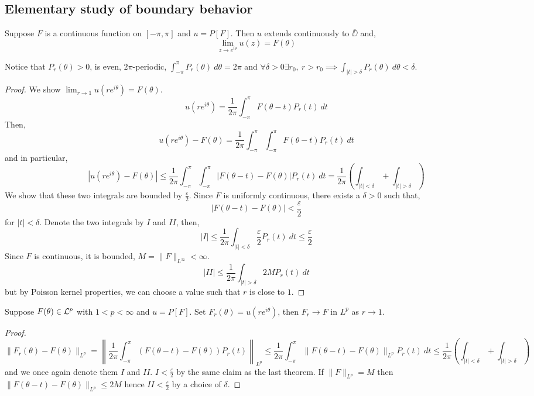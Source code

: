 \subsection{Elementary study of boundary behavior}
\begin{theorem}
	Suppose $F$ is a continuous function on $[-\pi, \pi]$ and $u = P[F]$.
	Then $u$ extends continuously to $\overline{\DD}$ and,
	\[
		\lim_{z \to e^{i \theta}} u(z)
		= F(\theta)
	\]
\end{theorem}
Notice that $P_r(\theta) > 0$, is even, $2 \pi$-periodic, $\int_{-\pi}^{\pi} P_r(\theta)\ d \theta = 2 \pi$
and $\forall \delta > 0 \exists r_0,\ r > r_0 \implies \int_{|t| > \delta} P_r(\theta)\ d \theta < \delta$.
\begin{proof}
	We show $\lim_{r \to 1} u(r e^{i \theta}) = F(\theta)$.
	\[
		u(r e^{i \theta})
		= \frac{1}{2 \pi} \int_{-\pi}^{\pi} F(\theta - t) P_r(t)\ d t
	\]
	Then,
	\[
		u(r e^{i \theta}) - F(\theta)
		= \frac{1}{2 \pi} \int_{-\pi}^{\pi} \int_{-\pi}^{\pi} F(\theta - t) P_r(t)\ dt
	\]
	and in particular,
	\[
		|u(r e^{i \theta}) - F(\theta)|
		\le \frac{1}{2 \pi} \int_{-\pi}^{\pi} \int_{-\pi}^{\pi} |F(\theta - t) - F(\theta)| P_r(t)\ dt
		= \frac{1}{2 \pi} (\int_{|t| < \delta} + \int_{|t| > \delta})
	\]
	We show that these two integrals are bounded by $\frac{\varepsilon}{2}$.
	Since $F$ is uniformly continuous, there exists a $\delta > 0$ such that,
	\[
		|F(\theta - t) - F(\theta)| < \frac{\varepsilon}{2}
	\]
	for $|t| < \delta$.
	Denote the two integrals by $I$ and $I\!I$, then,
	\[
		|I|
		\le \frac{1}{2 \pi} \int_{|t| < \delta} \frac{\varepsilon}{2} P_r(t)\ dt
		\le \frac{\varepsilon}{2}
	\]
	Since $F$ is continuous, it is bounded, $M = \lVert F \rVert_{L^\infty} < \infty$.
	\[
		|I\!I|
		\le \frac{1}{2 \pi} \int_{|t| > \delta} 2 M P_r(t)\ dt
	\]
	but by Poisson kernel properties, we can choose a value such that $r$ is close to $1$.
\end{proof}
\begin{theorem}
	Suppose $F(\theta) \in \mathcal{L}^p$ with $1 < p < \infty$ and $u = P[F]$.
	Set $F_r(\theta) = u(r e^{i \theta})$, then $F_r \to F$ in $L^p$ as $r \to 1$.
\end{theorem}
\begin{proof}
	\[
		\lVert F_r(\theta) - F(\theta) \rVert_{L^p}
		= \left\lVert \frac{1}{2 \pi} \int_{-\pi}^{\pi} (F(\theta - t) - F(\theta)) P_r(t) \right\rVert_{L^p}
		\le \frac{1}{2 \pi} \int_{-\pi}^{\pi} \lVert F(\theta - t) - F(\theta) \rVert_{L^p} P_r(t)\ dt
		\le \frac{1}{2 \pi} (\int_{|t| < \delta} + \int_{|t| > \delta})
	\]
	and we once again denote them $I$ and $I\!I$.
	$I < \frac{\varepsilon}{2}$ by the same claim as the last theorem.
	If $\lVert F \rVert_{L^p} = M$ then $\lVert F(\theta - t) - F(\theta) \rVert_{L^p} \le 2 M$ hence $I\!I < \frac{\varepsilon}{2}$ by a choice of $\delta$.
\end{proof}

